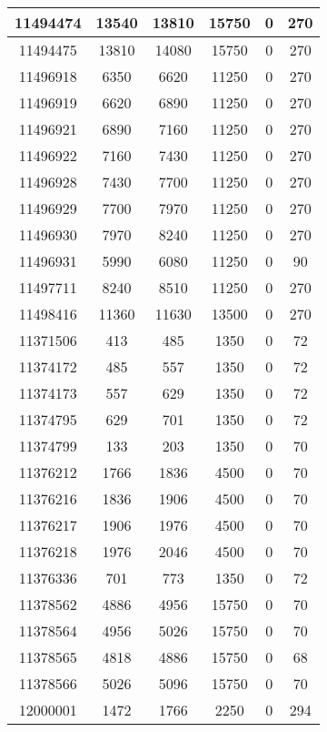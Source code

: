 \begin{appendices}
\begin{center}
\begin{longtable}{|c|c|c|c|c|c|}
11494474 & 13540 & 13810 & 15750 & 0     & 270 \\ \hline
11494475 & 13810 & 14080 & 15750 & 0     & 270 \\ \hline
11496918 & 6350  & 6620  & 11250 & 0     & 270 \\ \hline
11496919 & 6620  & 6890  & 11250 & 0     & 270 \\ \hline
11496921 & 6890  & 7160  & 11250 & 0     & 270 \\ \hline
11496922 & 7160  & 7430  & 11250 & 0     & 270 \\ \hline
11496928 & 7430  & 7700  & 11250 & 0     & 270 \\ \hline
11496929 & 7700  & 7970  & 11250 & 0     & 270 \\ \hline
11496930 & 7970  & 8240  & 11250 & 0     & 270 \\ \hline
11496931 & 5990  & 6080  & 11250 & 0     & 90  \\ \hline
11497711 & 8240  & 8510  & 11250 & 0     & 270 \\ \hline
11498416 & 11360 & 11630 & 13500 & 0     & 270 \\ \hline
11371506 & 413   & 485   & 1350  & 0     & 72  \\ \hline
11374172 & 485   & 557   & 1350  & 0     & 72  \\ \hline
11374173 & 557   & 629   & 1350  & 0     & 72  \\ \hline
11374795 & 629   & 701   & 1350  & 0     & 72  \\ \hline
11374799 & 133   & 203   & 1350  & 0     & 70  \\ \hline
11376212 & 1766  & 1836  & 4500  & 0     & 70  \\ \hline
11376216 & 1836  & 1906  & 4500  & 0     & 70  \\ \hline
11376217 & 1906  & 1976  & 4500  & 0     & 70  \\ \hline
11376218 & 1976  & 2046  & 4500  & 0     & 70  \\ \hline
11376336 & 701   & 773   & 1350  & 0     & 72  \\ \hline
11378562 & 4886  & 4956  & 15750 & 0     & 70  \\ \hline
11378564 & 4956  & 5026  & 15750 & 0     & 70  \\ \hline
11378565 & 4818  & 4886  & 15750 & 0     & 68  \\ \hline
11378566 & 5026  & 5096  & 15750 & 0     & 70  \\ \hline
12000001 & 1472  & 1766  & 2250  & 0     & 294 \\ \hline

\end{longtable}
\end{center}
\end{appendices}
